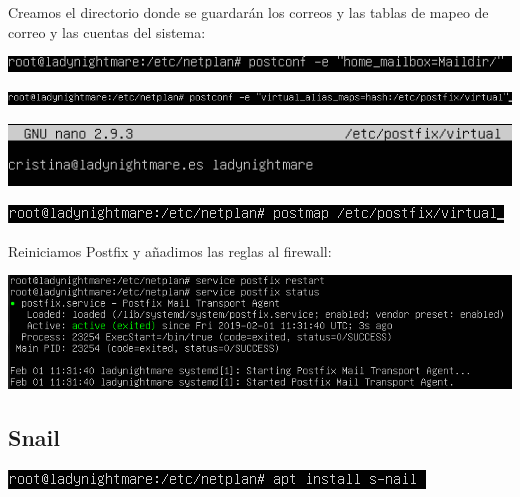 \documentclass{article}
\begin{document}
Creamos el directorio donde se guardarán los correos y las tablas de mapeo de correo y las cuentas del sistema:

\begin{center}
\includegraphics[scale=0.6]{images/homemailbox.png}
\end{center}

\begin{center}
\includegraphics[scale=0.6]{images/hash.png}
\end{center}

\begin{center}
\includegraphics[scale=0.6]{images/virtual.png}
\end{center}

\begin{center}
\includegraphics[scale=0.6]{images/postmap.png}
\end{center}

Reiniciamos Postfix y añadimos las reglas al firewall:

\begin{center}
\includegraphics[scale=0.6]{images/postfixR.png}
\end{center}

\subsection{S\-nail}

\begin{center}
\includegraphics[scale=0.6]{images/snail.png}
\end{center}
\end{document}
